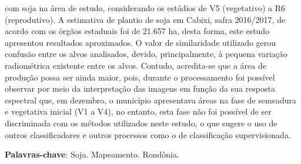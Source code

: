 \documentclass[article,12pt,onesidea,4paper,english,brazil]{abntex2}
\begin{document}
	com soja na área de estudo, considerando os estádios de V5 (vegetativo) a R6
	(reprodutivo). A estimativa de plantio de soja em Cabixi, safra 2016/2017, de acordo
	com os órgãos estaduais foi de 21.657 ha, desta forma, este estudo apresentou
	resultados aproximados. O valor de similaridade utilizado gerou confusão entre os
	alvos analisados, devido, principalmente, à pequena variação radiométrica existente
	entre os alvos. Contudo, acredita-se que a área de produção possa ser ainda maior,
	pois, durante o processamento foi possível observar por meio da interpretação das
	imagens em função da sua resposta espectral que, em dezembro, o município
	apresentava áreas na fase de semeadura e vegetativa inicial (V1 a V4), no entanto,
	esta fase não foi possível de ser discriminada com os métodos utilizados neste
	estudo, o que sugere o uso de outros classificadores e outros processos como o de
	classificação supervisionada.
	
	\vspace{\onelineskip}
	
	\noindent
	\textbf{Palavras-chave}: Soja. Mapeamento. Rondônia.
	
\end{document}
